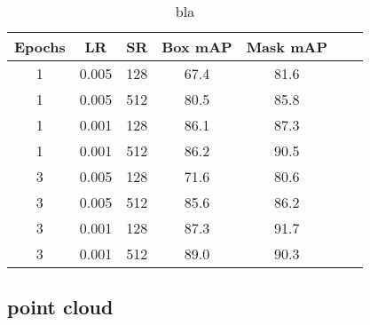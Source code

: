 \begin{table}
	\centering
	\caption[Detection evaluation]{bla}
	\label{tab:detection_eval}
	\begin{tabular}[H!]{ccccccc}
		\toprule
		\textbf{Epochs} & \textbf{LR} & \textbf{SR} & \textbf{Box mAP} & \textbf{Mask mAP} \\
		\midrule
		1               & 0.005       & 128         & 67.4             & 81.6              \\
		1               & 0.005       & 512         & 80.5             & 85.8              \\
		1               & 0.001       & 128         & 86.1             & 87.3              \\
		1               & 0.001       & 512         & 86.2             & 90.5              \\
		3               & 0.005       & 128         & 71.6             & 80.6              \\
		3               & 0.005       & 512         & 85.6             & 86.2              \\
		3               & 0.001       & 128         & 87.3             & 91.7              \\
		3               & 0.001       & 512         & 89.0             & 90.3              \\
		\bottomrule
	\end{tabular}
\end{table}

\subsection{point cloud}
